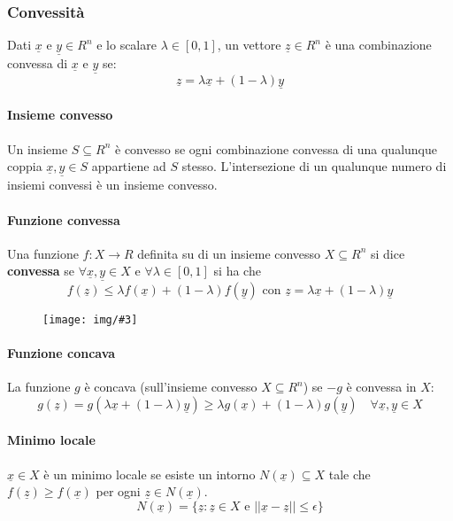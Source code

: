 \documentclass[12pt, twoside, letterpaper]{article}
\newcommand{\img}[3] {
	\begin{figure}[h]
		\caption*{#1}
		\centering
		\texttt{[image: img/\#3]}\\
	\end{figure}
}
\begin{document}
			\subsubsection{Convessità}
				Dati $\underline{x}$ e $\underline{y} \in R^n$ e lo scalare $\lambda \in [0,1]$, un vettore $\underline{z} \in R^n$ è una combinazione convessa di $\underline{x}$ e $\underline{y}$ se: $$\underline{z} = \lambda \underline{x} + (1- \lambda) \underline{y}$$
				
				\paragraph{Insieme convesso} Un insieme $S \subseteq R^n$ è convesso se ogni combinazione convessa di una qualunque coppia $\underline{x}, \underline{y} \in S$ appartiene ad $S$ stesso. L'intersezione di un qualunque numero di insiemi convessi è un insieme convesso.
			
				\paragraph{Funzione convessa} Una funzione $f: X \rightarrow R$ definita su di un insieme convesso $X \subseteq R^n$ si dice \textbf{convessa} se $\forall \underline{x}, \underline{y} \in X$ e $\forall \lambda \in [0,1]$ si ha che $$f(\underline{z}) \leq \lambda f( \underline{x} ) + (1-\lambda)f(\underline{y})\text{ con }\underline{z} = \lambda \underline{x} +(1-\lambda)\underline{y}$$
				\img{}{0.335}{img5.png}
				
				\paragraph{Funzione concava} La funzione $g$ è concava (sull'insieme convesso $X \subseteq R^n$) se $-g$ è convessa in $X$: $$g(\underline{z}) = g(\lambda \underline{x} + (1-\lambda) \underline{y}) \geq \lambda g(\underline{x}) + (1 - \lambda) g(\underline{y}) \quad \forall \underline{x}, \underline{y} \in X$$
				
				\paragraph{Minimo locale} $\underline{x} \in X$ è un minimo locale se esiste un intorno $N(\underline{x}) \subseteq X$ tale che $f(\underline{z}) \geq f(\underline{x})$ per ogni $\underline{z} \in N(\underline{x})$. $$N(\underline{x}) = \{\underline{z} : \underline{z} \in X \text{ e } ||\underline{x} - \underline{z} || \leq \epsilon \}$$	
				
\end{document}
